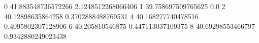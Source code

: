 0 41.883548736572266 2.1248512268066406
1 39.758697509765625 0.0
2 40.12898635864258 0.3702888488769531
4 40.168277740478516 0.4095802307128906
6 40.205810546875 0.447113037109375
8 40.69298553466797 0.9342880249023438
